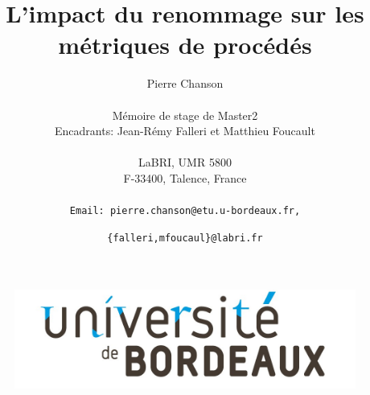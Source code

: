 \documentclass[12pt,a4paper]{article}
\title{\vspace{4cm}\textbf{L'impact du renommage sur les métriques de procédés}\vspace{3cm}}
\author{
Pierre Chanson\\\\
Mémoire de stage de Master2\\
Encadrants: Jean-Rémy Falleri et Matthieu Foucault\\\\
LaBRI, UMR 5800\\
F-33400, Talence, France\\\\
\texttt{Email: pierre.chanson@etu.u-bordeaux.fr,}\and
\texttt{\{falleri,mfoucaul\}@labri.fr}\\
}
\begin{document}
\begin{figure}[t]
\center
\includegraphics[scale=0.25]{data/figures/UnivBordeaux.jpg}
\end{figure}
\maketitle

\newpage
\tableofcontents
\newpage

\newpage

\newpage

\newpage

\newpage

\newpage

\newpage


%
\end{document}
